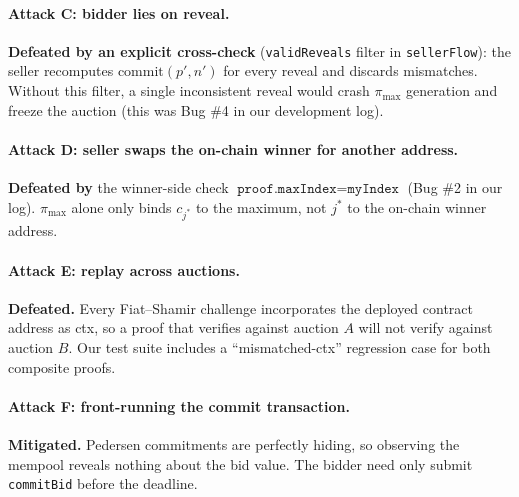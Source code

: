 \documentclass[11pt,a4paper]{article}
\begin{document}
\paragraph{Attack C: bidder lies on reveal.}
\textbf{Defeated by an explicit cross-check} (\texttt{validReveals} filter
in \texttt{sellerFlow}): the seller recomputes
$\mathrm{commit}(p',n')$ for every reveal and discards mismatches. Without
this filter, a single inconsistent reveal would crash $\pi_{\max}$ generation
and freeze the auction (this was Bug \#4 in our development log).

\paragraph{Attack D: seller swaps the on-chain winner for another address.}
\textbf{Defeated by} the winner-side check $\texttt{proof.maxIndex} =
\texttt{myIndex}$ (Bug \#2 in our log). $\pi_{\max}$ alone only binds
$c_{j^*}$ to the maximum, not $j^*$ to the on-chain winner address.

\paragraph{Attack E: replay across auctions.}
\textbf{Defeated.} Every Fiat--Shamir challenge incorporates the deployed
contract address as \textsf{ctx}, so a proof that verifies against auction $A$
will not verify against auction $B$. Our test suite includes a
``mismatched-ctx'' regression case for both composite proofs.

\paragraph{Attack F: front-running the commit transaction.}
\textbf{Mitigated.} Pedersen commitments are perfectly hiding, so observing
the mempool reveals nothing about the bid value. The bidder need only submit
\texttt{commitBid} before the deadline.
\end{document}
